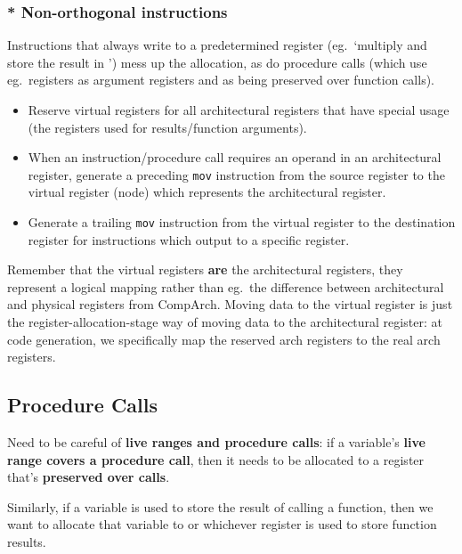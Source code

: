 \documentclass[a4paper, 11pt]{article}
\begin{document}
{{        \subsubsection*{* Non-orthogonal instructions}
        {
            Instructions that always write to a predetermined register (eg.\ `multiply and store the result in ') mess up the allocation, as do procedure calls (which use eg.\ registers  as argument registers and  as being preserved over function calls).

            \begin{itemize}
            \item Reserve virtual registers for all architectural registers that have special usage (the registers used for results/function arguments).
            \item When an instruction/procedure call requires an operand in an architectural register, generate a preceding \texttt{mov} instruction from the source register to the virtual register (node) which represents the architectural register.
            \item Generate a trailing \texttt{mov} instruction from the virtual register to the destination register for instructions which output to a specific register.
            \end{itemize}

            Remember that the virtual registers \textbf{are} the architectural registers, they represent a logical mapping rather than eg.\ the difference between architectural and physical registers from CompArch. Moving data to the virtual register is just the register-allocation-stage way of moving data to the architectural register: at code generation, we specifically map the reserved arch registers to the real arch registers.
        }
    }
    \subsection*{Procedure Calls}
    {
        Need to be careful of \textbf{live ranges and procedure calls}: if a variable's \textbf{live range covers a procedure call}, then it needs to be allocated to a register that's \textbf{preserved over calls}.
        
        Similarly, if a variable is used to store the result of calling a function, then we want to allocate that variable to  or whichever register is used to store function results.
    }
}
\end{document}
